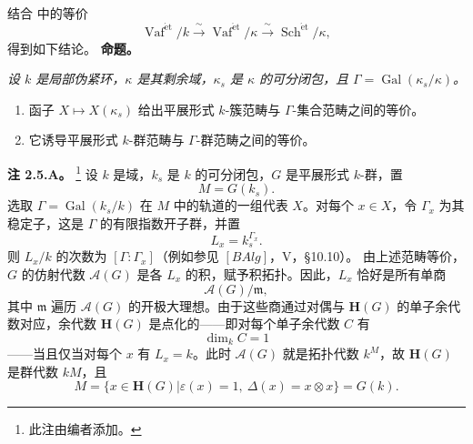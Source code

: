 结合  中的等价
\[
  \operatorname{Vaf}^{\mathrm{\acute{e}t}}/k
  \xrightarrow{\ \sim\ }
  \operatorname{Vaf}^{\mathrm{\acute{e}t}}/\kappa
  \xrightarrow{\ \sim\ }
  \operatorname{Sch}^{\mathrm{\acute{e}t}}/\kappa,
\]
得到如下结论。
\medskip
\noindent\textbf{命题。}
\label{sga3:VIIB:2.5:proposition}
{\itshape 设 \(k\) 是局部伪紧环，\(\kappa\) 是其剩余域，\(\kappa_s\) 是 \(\kappa\) 的可分闭包，且 \(\Gamma=\operatorname{Gal}(\kappa_s/\kappa)\)。
\begin{enumerate}
\item[\textup{(i)}] 函子 \(X\mapsto X(\kappa_s)\) 给出平展形式 \(k\)-簇范畴与 \(\Gamma\)-集合范畴之间的等价。
\item[\textup{(ii)}] 它诱导平展形式 \(k\)-群范畴与 \(\Gamma\)-群范畴之间的等价。
\end{enumerate}}
\medskip
\noindent\textbf{注 2.5.A。}
\label{sga3:VIIB:2.5.A}
\footnote{\label{sga3:VIIB:nde:96}此注由编者添加。}
设 \(k\) 是域，\(k_s\) 是 \(k\) 的可分闭包，\(G\) 是平展形式 \(k\)-群，置
\[
  M=G(k_s).
\]
选取 \(\Gamma=\operatorname{Gal}(k_s/k)\) 在 \(M\) 中的轨道的一组代表 \(X\)。对每个 \(x\in X\)，令 \(\Gamma_x\) 为其稳定子，这是 \(\Gamma\) 的有限指数开子群，并置
\[
  L_x=k_s^{\Gamma_x}.
\]
则 \(L_x/k\) 的次数为 \([\Gamma:\Gamma_x]\)\textup{（例如参见 \([BAlg]\)，V，§10.10）}。
由上述范畴等价，\(G\) 的仿射代数 \(\mathcal A(G)\) 是各 \(L_x\) 的积，赋予积拓扑。因此，\(L_x\) 恰好是所有单商
\[
  \mathcal A(G)/\mathfrak m,
\]
其中 \(\mathfrak m\) 遍历 \(\mathcal A(G)\) 的开极大理想。由于这些商通过对偶与 \(\mathbf H(G)\) 的单子余代数对应，余代数 \(\mathbf H(G)\) 是点化的——即对每个单子余代数 \(C\) 有
\[
  \dim_kC=1
\]
——当且仅当对每个 \(x\) 有 \(L_x=k\)。此时 \(\mathcal A(G)\) 就是拓扑代数 \(k^M\)，故 \(\mathbf H(G)\) 是群代数 \(kM\)，且
\[
  M
  =
  \bigl\{
    x\in\mathbf H(G)
    \mathrel{\big|}
    \varepsilon(x)=1,\ \Delta(x)=x\otimes x
  \bigr\}
  =
  G(k).
\]
